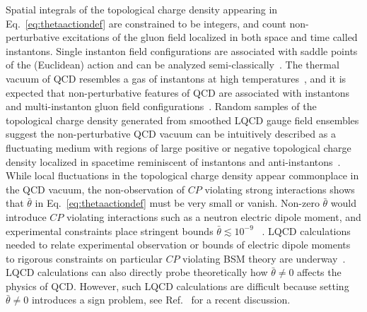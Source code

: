 Spatial integrals of the topological charge density appearing in Eq.~\eqref{eq:thetaactiondef} are constrained to be integers, and count non-perturbative excitations of the gluon field localized in both space and time called instantons.
Single instanton field configurations are associated with saddle points of the (Euclidean) action and can be analyzed semi-classically~\cite{Belavin:1975fg,tHooft:1976fv}.
The thermal vacuum of QCD resembles a gas of instantons at high temperatures~\cite{Gross:1980br}, and it is expected that non-perturbative features of QCD are associated with instantons and multi-instanton gluon field configurations~\cite{Schafer:1996wv}.
Random samples of the topological charge density generated from smoothed LQCD gauge field ensembles suggest the non-perturbative QCD vacuum can be intuitively described as a fluctuating medium with regions of large positive or negative topological charge density localized in spacetime reminiscent of instantons and anti-instantons~\cite{Chu:1994vi,Gattringer:2001ia}.
While local fluctuations in the topological charge density appear commonplace in the QCD vacuum, the non-observation of $CP$ violating strong interactions shows that $\bar{\theta}$ in Eq.~\eqref{eq:thetaactiondef} must be very small or vanish.
Non-zero $\bar{\theta}$ would introduce $CP$ violating interactions such as a neutron electric dipole moment, and experimental constraints place stringent bounds $\bar{\theta} \lesssim 10^{-9}$ ~\cite{He:1990qa,Baker:2006ts}.
LQCD calculations needed to relate experimental observation or bounds of electric dipole moments to rigorous constraints on particular $CP$ violating BSM theory are underway~\cite{Shintani:2005xg,Guo:2015tla,Shintani:2015vsx,Bhattacharya:2016zcn,Gupta:2017anz}.
LQCD calculations can also directly probe theoretically how $\bar{\theta}\neq 0$ affects the physics of QCD.
However, such LQCD calculations are difficult because setting $\bar{\theta}\neq 0$ introduces a sign problem, see Ref.~\cite{Cai:2016eot} for a recent discussion.

